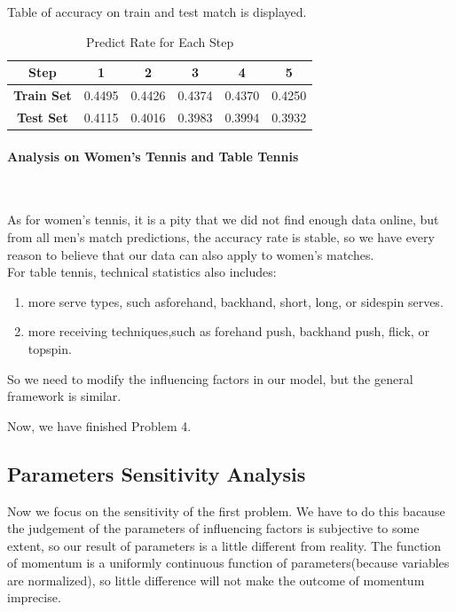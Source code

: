 Table of accuracy on train and test match is displayed.

\begin{table}[H]
    \centering
    \begin{tabular}{cccccc}
        \toprule
        \textbf{Step} & \textbf{1} & \textbf{2} & \textbf{3} & \textbf{4} & \textbf{5} \\
        \midrule
        \textbf{Train Set} & 0.4495 & 0.4426 & 0.4374 & 0.4370 & 0.4250 \\
        \textbf{Test Set} & 0.4115 & 0.4016 & 0.3983 & 0.3994 & 0.3932 \\
        \bottomrule
    \end{tabular}
    \caption{Predict Rate for Each Step}
    \label{tab:predict_rate}
\end{table}

\paragraph{Analysis on Women's Tennis and Table Tennis}~{}

As for women's tennis, it is a pity that we did not find enough data online, but from all men's match predictions, the 
accuracy rate is stable, so we have every reason to believe that our data can also apply to women's matches. \\
For table tennis, technical statistics also includes: 
\begin{enumerate}
    \item more serve types, such asforehand, backhand, short, long, or sidespin serves.
    \item more receiving techniques,such as forehand push, backhand push, flick, or topspin.
\end{enumerate}
So we need to modify the influencing factors in our model, but the general framework is similar.

Now, we have finished Problem 4.

\subsection{Parameters Sensitivity Analysis}

Now we focus on the sensitivity of the first problem. We have to do this bacause the judgement of the parameters of 
influencing factors is subjective to some extent, so our result of parameters is a little different from reality. 
The function of momentum is a uniformly continuous function of parameters(because variables are normalized), so little
difference will not make the outcome of momentum imprecise.